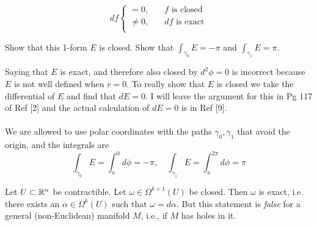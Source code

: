 \documentclass[10pt]{article}
\begin{document}
\begin{definition}
	$$
	df\begin{cases}
		=0,\quad&\text{$f$ is closed}\\
		\ne0,&\text{$df$ is exact}\\
	\end{cases}
	$$
\end{definition}


\begin{example}
	Show that this 1-form $E$ is closed. Show that $\int_{\gamma_0}E=-\pi$ and $\int_{\gamma_1}E=\pi$.
\end{example}
\sol Saying that $E$ is exact, and therefore also closed by $d^2\phi = 0$ is incorrect because $E$ is not well defined when $r=0$. To really show that $E$ is closed we take the differential of $E$ and find that $dE=0$. I will leave the argument for this in Pg 117 of Ref [2] and the actual calculation of $dE=0$ is in Ref [9].\\\\
We are allowed to use polar coordinates with the paths $\gamma_0, \gamma_1$ that avoid the origin, and the integrals are
$$
\int_{\gamma_0} E = \int_{\pi}^{0} d\phi = -\pi, \quad \int_{\gamma_1} E = \int_{\pi}^{2\pi} d\phi = \pi
$$

\begin{definition}
	 Let $U \subset \mathbb{R}^n$ be contractible. Let $\omega \in \Omega^{k+1}(U)$ be closed. Then $\omega$ is exact, i.e. there exists an $\alpha \in \Omega^k(U)$ such that $\omega = d\alpha$. But this statement is \emph{false} for a general (non-Euclidean) manifold $M$, i.e., if $M$ has holes in it.
\end{definition}
\end{document}
